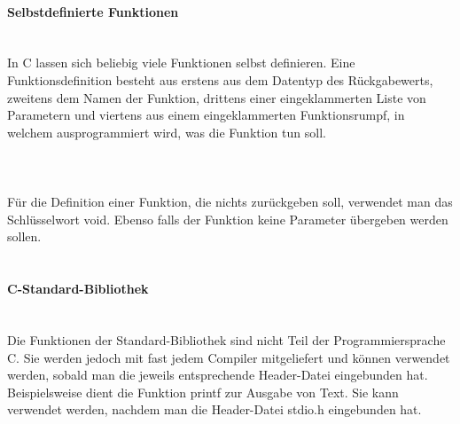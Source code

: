 \paragraph{Selbstdefinierte Funktionen}
\ \\
In C lassen sich beliebig viele Funktionen selbst definieren. Eine Funktionsdefinition besteht aus erstens aus dem Datentyp des Rückgabewerts, zweitens dem Namen der Funktion, drittens einer eingeklammerten Liste von Parametern und viertens aus einem eingeklammerten Funktionsrumpf, in welchem ausprogrammiert wird, was die Funktion tun soll.\\
\ \\
\\
\ \\
Für die Definition einer Funktion, die nichts zurückgeben soll, verwendet man das Schlüsselwort void. Ebenso falls der Funktion keine Parameter übergeben werden sollen.\\
\ \\

\cite{c_wiki}

\paragraph{C-Standard-Bibliothek}
\ \\
Die Funktionen der Standard-Bibliothek sind nicht Teil der Programmiersprache C. Sie werden jedoch mit fast jedem Compiler mitgeliefert und können verwendet werden, sobald man die jeweils entsprechende Header-Datei eingebunden hat. Beispielsweise dient die Funktion printf zur Ausgabe von Text. Sie kann verwendet werden, nachdem man die Header-Datei stdio.h eingebunden hat.\\
\ \\
\ \\
\cite{c_wiki}
\ \\
